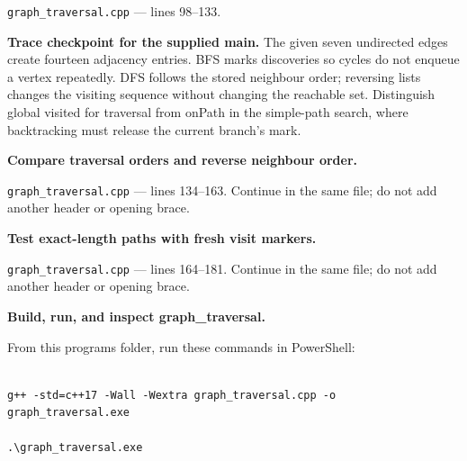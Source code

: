 \texttt{graph\_traversal.cpp} --- lines 98--133.



\textbf{Trace checkpoint for the supplied main.} The given seven undirected edges create fourteen adjacency entries. BFS marks discoveries so cycles do not enqueue a vertex repeatedly. DFS follows the stored neighbour order; reversing lists changes the visiting sequence without changing the reachable set. Distinguish global visited for traversal from onPath in the simple-path search, where backtracking must release the current branch's mark.




\tcbbreak

\begin{utpsteps}\setcounter{enumi}{4}\item \textbf{Compare traversal orders and reverse neighbour order.}\end{utpsteps}

\texttt{graph\_traversal.cpp} --- lines 134--163. Continue in the same file; do not add another header or opening brace.





\tcbbreak

\begin{utpsteps}\setcounter{enumi}{5}\item \textbf{Test exact-length paths with fresh visit markers.}\end{utpsteps}

\texttt{graph\_traversal.cpp} --- lines 164--181. Continue in the same file; do not add another header or opening brace.






\tcbbreak

\textbf{Build, run, and inspect graph\_traversal.}

From this program\textquotesingle s folder, run these commands in PowerShell:

\begin{lstlisting}[style=utpterminal,language={}]

g++ -std=c++17 -Wall -Wextra graph_traversal.cpp -o graph_traversal.exe

.\graph_traversal.exe

\end{lstlisting}

